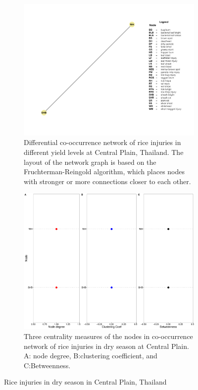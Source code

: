  \begin{figure}
    \centering
    \begin{subfigure}[b]{1\textwidth}
        \includegraphics[width = 1\textwidth]{figures/difyieldTM.pdf}
        \caption{Differential co-occurrence network of rice injuries in different yield levels at Central Plain, Thailand. The layout of the network graph is based on the Fruchterman-Reingold algorithm, which places nodes with stronger or more connections closer to each other.}
        \label{fig:networkCP_ds}
    \end{subfigure}
    \begin{subfigure}[b]{1\textwidth}
        \includegraphics[width = 1\textwidth]{figures/yield_dif_nodepropTamil_Nadu.pdf}
        \caption{Three centrality measures of the nodes in co-occurrence network of rice injuries in dry season at Central Plain. A: node degree, B:clustering coefficient, and C:Betweenness.}
        \label{fig:nodepropdifyield_TM}
    \end{subfigure}
    \caption{Rice injuries in dry season in Central Plain, Thailand}
    \label{fig:CP_ds}
\end{figure}


